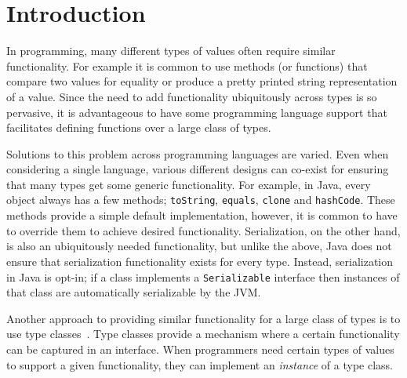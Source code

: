 \documentclass[preprint,nocopyrightspace]{sigplanconf}
\begin{document}



\section{Introduction}



In programming, many different types of values often require similar
functionality. For example it is common to use methods (or
functions) that compare two values for equality or produce a pretty
printed string representation of a value.
Since the need to add functionality ubiquitously across types is so pervasive,
it is advantageous to have some programming language support
that facilitates defining functions over a large class of types.

Solutions to this problem across programming languages are varied.
Even when considering a single language, various different
designs can co-exist for ensuring that many types get some
generic functionality.
For example, in Java, every object always has a few
methods; \lstinline{toString}, \lstinline{equals},
\lstinline{clone} and \lstinline{hashCode}.
These methods provide a simple default implementation, however,
it is common to have to override them to achieve desired functionality.
Serialization, on the other hand, is also an ubiquitously needed
functionality, but unlike the above, Java
does not ensure that serialization functionality exists for every type.
Instead, serialization in Java is opt-in; if a class
implements a \lstinline{Serializable} interface then instances of
that class are automatically serializable by the JVM.


Another approach to providing similar functionality for a large class
of types is to use type classes~\cite{WadlerTypeClasses}. Type classes provide a
mechanism where a certain functionality can be captured in an
interface. When programmers need certain types of values to support a
given functionality, they can implement an \emph{instance} of a type
class.
\end{document}
